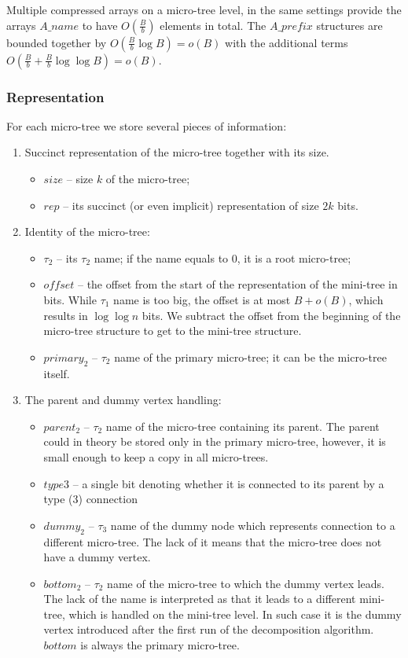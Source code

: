 Multiple compressed arrays on a micro-tree level, in the same settings provide the arrays $A\_name$ to have $O(\frac{B}{b})$ elements in total.
The $A\_prefix$ structures are bounded together by $O(\frac{B}{b} \log B) = o(B)$ with the additional terms $O(\frac{B}{b} + \frac{B}{b} \log \log B) = o(B)$.

\subsubsection{Representation}

For each micro-tree we store several pieces of information:
\begin{enumerate}
	\item Succinct representation of the micro-tree together with its size.
	\begin{itemize}
		\item $size$ -- size $k$ of the micro-tree;
		\item $rep$ -- its succinct (or even implicit) representation of size $2k$ bits.
	\end{itemize}
	
	\item Identity of the micro-tree:
	\begin{itemize}
		\item $\tau_2$ -- its $\tau_2$ name; if the name equals to $0$, it is a root micro-tree;
		\item $offset$ -- the offset from the start of the representation of the mini-tree in bits.
		While $\tau_1$ name is too big, the offset is at most $B + o(B)$, which results in $\log \log n$ bits.
		We subtract the offset from the beginning of the micro-tree structure to get to the mini-tree structure.
		\item $primary_2$ -- $\tau_2$ name of the primary micro-tree; it can be the micro-tree itself.
	\end{itemize}

	\item The parent and dummy vertex handling:
	\begin{itemize}
		\item $parent_2$ -- $\tau_2$ name of the micro-tree containing its parent.
		The parent could in theory be stored only in the primary micro-tree, however, it is small enough to keep a copy in all micro-trees.
		\item $type3$ -- a single bit denoting whether it is connected to its parent by a type (3) connection
		\item $dummy_2$ -- $\tau_3$ name of the dummy node which represents connection to a different micro-tree.
		The lack of it means that the micro-tree does not have a dummy vertex.
		\item $bottom_2$ -- $\tau_2$ name of the micro-tree to which the dummy vertex leads.
		The lack of the name is interpreted as that it leads to a different mini-tree, which is handled on the mini-tree level.
		In such case it is the dummy vertex introduced after the first run of the decomposition algorithm.
		$bottom$ is always the primary micro-tree.
	\end{itemize}
	

\end{enumerate}
